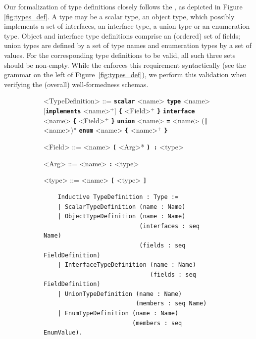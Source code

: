 Our formalization of type definitions closely follows the \spec, as
depicted in Figure~ \ref{fig:types_def}. A type may be a scalar type,
an object type, which possibly implements a set of interfaces, an
interface type, a union type or an enumeration type. Object and
interface type definitions comprise an (ordered) set of fields; union
types are defined by a set of type names and enumeration types by a
set of values. For the corresponding type definitions to be valid, all
such three sets should be non-empty. While the \spec enforces this
requirement syntactically (see the grammar on the left of Figure~\ref{fig:types_def}), we perform this validation when verifying the (overall) well-formedness schemas.     
%
\setlength{\grammarparsep}{10pt plus 1pt minus 1pt} %
\begin{figure}[h]
    \centering
    \begin{subfigure}{.5\textwidth}
    \begin{grammar}
    <TypeDefinition> ::= \mbox{} 
    \alt \textbf{\texttt{scalar}} <name>
    \alt \textbf{\texttt{type}} <name> [\textbf{\texttt{implements}} <name>$^{+}$] \textbf{\texttt{\{}} <Field>$^{+}$ \textbf{\texttt{\}}}
    \alt \textbf{\texttt{interface}} <name> \textbf{\texttt{\{}} <Field>$^{+}$ \textbf{\texttt{\}}}
    \alt \textbf{\texttt{union}} <name> \textbf{\texttt{=}} <name> (\textbf{\texttt{|}} <name>)*
    \alt \textbf{\texttt{enum}} <name>  \textbf{\texttt{\{}}  <name>$^{+}$ \textbf{\texttt{\}}}

    <Field> ::= <name> \textbf{\texttt{(}} <Arg>* \textbf{\texttt{) :}} <type>

    <Arg> ::= <name> \textbf{\texttt{:}} <type>

    <type> ::= <name>
    \alt \textbf{\texttt{[}}  <type> \textbf{\texttt{]}}
    \end{grammar}
    \end{subfigure}%
    \begin{subfigure}{.5\textwidth}
    \begin{verbatim}
    Inductive TypeDefinition : Type :=
    | ScalarTypeDefinition (name : Name)
    | ObjectTypeDefinition (name : Name)
                           (interfaces : seq Name)
                           (fields : seq FieldDefinition)
    | InterfaceTypeDefinition (name : Name)
                              (fields : seq FieldDefinition)
    | UnionTypeDefinition (name : Name)
                          (members : seq Name)
    | EnumTypeDefinition (name : Name)
                         (members : seq EnumValue).


\end{verbatim}
\end{subfigure}
\end{figure}
